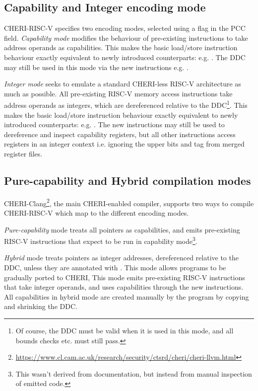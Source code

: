 \subsection{Capability and Integer encoding mode\label{chap:bg:subsec:cheriencodingmode}}
CHERI-RISC-V specifies two encoding modes, selected using a flag in the PCC  field.
\emph{Capability mode} modifies the behaviour of pre-existing instructions to take address operands as capabilities.
This makes the basic load/store instruction behaviour exactly equivalent to newly introduced counterparts: e.g. .
The DDC may still be used in this mode via the new instructions e.g. .

\emph{Integer mode} seeks to emulate a standard CHERI-less RISC-V architecture as much as possible.
All pre-existing RISC-V memory access instructions take address operands as integers, which are dereferenced relative to the DDC\footnote{Of course, the DDC must be valid when it is used in this mode, and all bounds checks etc. must still pass.}.
This makes the basic load/store instruction behaviour exactly equivalent to newly introduced counterparts: e.g. .
The new instructions may still be used to dereference and inspect capability registers, but all other instructions access registers in an integer context i.e. ignoring the upper bits and tag from merged register files.

\subsection{Pure-capability and Hybrid compilation modes}
CHERI-Clang\footnote{\url{https://www.cl.cam.ac.uk/research/security/ctsrd/cheri/cheri-llvm.html}}, the main CHERI-enabled compiler, supports two ways to compile CHERI-RISC-V which map to the different encoding modes.

\emph{Pure-capability} mode treats all pointers as capabilities, and emits pre-existing RISC-V instructions that expect to be run in capability mode\footnote{This wasn't derived from documentation, but instead from manual inspection of emitted code.}.

\emph{Hybrid} mode treats pointers as integer addresses, dereferenced relative to the DDC, unless they are annotated with .
This mode allows programs to be gradually ported to CHERI, 
This mode emits pre-existing RISC-V instructions that take integer operands, and uses capabilities through the new instructions.
All capabilities in hybrid mode are created manually by the program by copying and shrinking the DDC.

